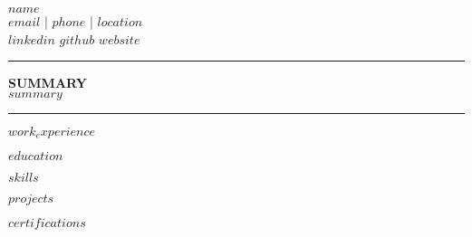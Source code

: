 \documentclass[11pt,a4paper]{article}
\begin{document}
\begin{center}
\textbf{\Large $name$}\\
$email$ | $phone$ | $location$\\
$linkedin$ $github$ $website$
\end{center}

\hrule
\vspace{0.3cm}

\textbf{SUMMARY}\\
$summary$

\vspace{0.3cm}
\hrule
\vspace{0.3cm}

$work_experience$

$education$

$skills$

$projects$

$certifications$
\end{document}
